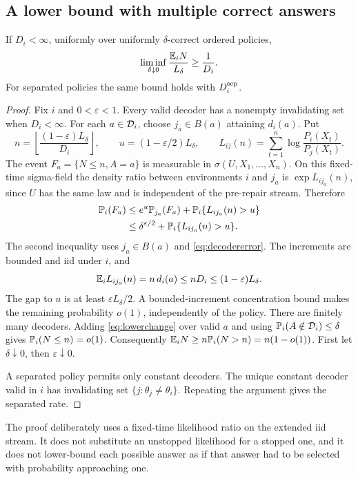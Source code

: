 \subsection{A lower bound with multiple correct answers}
\begin{lemma}\label{lem:lower}
If $D_i<\infty$, uniformly over uniformly $\delta$-correct ordered policies,
\[
 \liminf_{\delta\downarrow0}
 \frac{\mathbb E_iN}{L_\delta}\ge\frac{1}{D_i}.
\]
For separated policies the same bound holds with $D_i^{\rm sep}$.
\end{lemma}
\begin{proof}
Fix $i$ and $0<\varepsilon<1$. Every valid decoder has a nonempty invalidating
set when $D_i<\infty$. For each $a\in\mathcal D_i$, choose
$j_a\in B(a)$ attaining $d_i(a)$. Put
\[
 n=\left\lfloor\frac{(1-\varepsilon)L_\delta}{D_i}\right\rfloor,
 \qquad u=(1-\varepsilon/2)L_\delta,\qquad
 L_{ij}(n)=\sum_{t=1}^n\log\frac{P_i(X_t)}{P_j(X_t)}.
\]
The event $F_a=\{N\le n,A=a\}$ is measurable in
$\sigma(U,X_1,\ldots,X_n)$. On this fixed-time sigma-field the density ratio
between environments $i$ and $j_a$ is $\exp L_{ij_a}(n)$, since $U$ has the
same law and is independent of the pre-repair stream. Therefore
\begin{align}
 \mathbb P_i(F_a)
 &\le e^u\mathbb P_{j_a}(F_a)+\mathbb P_i\{L_{ij_a}(n)>u\}\nonumber\\
 &\le \delta^{\varepsilon/2}
       +\mathbb P_i\{L_{ij_a}(n)>u\}. \label{eq:lowerchange}
\end{align}
The second inequality uses $j_a\in B(a)$ and
\eqref{eq:decodererror}. The increments are bounded and iid under $i$, and
\[
 \mathbb E_iL_{ij_a}(n)=n\,d_i(a)\le nD_i\le(1-\varepsilon)L_\delta.
\]
The gap to $u$ is at least $\varepsilon L_\delta/2$.
A bounded-increment concentration bound makes the remaining probability
$o(1)$, independently of the policy. There are finitely many decoders.
Adding \eqref{eq:lowerchange} over valid $a$ and using
$\mathbb P_i(A\notin\mathcal D_i)\le\delta$ gives
$\mathbb P_i(N\le n)=o(1)$. Consequently
$\mathbb E_iN\ge n\mathbb P_i(N>n)=n(1-o(1))$.
First let $\delta\downarrow0$, then $\varepsilon\downarrow0$.

A separated policy permits only constant decoders. The unique constant decoder
valid in $i$ has invalidating set $\{j:\theta_j\ne\theta_i\}$.
Repeating the argument gives the separated rate.
\end{proof}
The proof deliberately uses a fixed-time likelihood ratio on the extended
iid stream. It does not substitute an unstopped likelihood for a stopped one,
and it does not lower-bound each possible answer as if that answer had to be
selected with probability approaching one.

